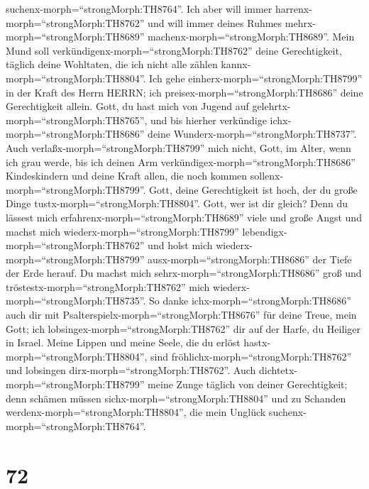 suchenx-morph=``strongMorph:TH8764''.  Ich aber will immer
harrenx-morph=``strongMorph:TH8762'' und will immer deines Ruhmes
mehrx-morph=``strongMorph:TH8689'' machenx-morph=``strongMorph:TH8689''.
 Mein Mund soll verkündigenx-morph=``strongMorph:TH8762''
deine Gerechtigkeit, täglich deine Wohltaten, die ich nicht alle zählen
kannx-morph=``strongMorph:TH8804''.  Ich gehe
einherx-morph=``strongMorph:TH8799'' in der Kraft des Herrn HERRN; ich
preisex-morph=``strongMorph:TH8686'' deine Gerechtigkeit allein.
 Gott, du hast mich von Jugend auf
gelehrtx-morph=``strongMorph:TH8765'', und bis hierher verkündige
ichx-morph=``strongMorph:TH8686'' deine
Wunderx-morph=``strongMorph:TH8737''.  Auch
verlaßx-morph=``strongMorph:TH8799'' mich nicht, Gott, im Alter, wenn
ich grau werde, bis ich deinen Arm
verkündigex-morph=``strongMorph:TH8686'' Kindeskindern und deine Kraft
allen, die noch kommen sollenx-morph=``strongMorph:TH8799''.
 Gott, deine Gerechtigkeit ist hoch, der du große Dinge
tustx-morph=``strongMorph:TH8804''. Gott, wer ist dir gleich?
 Denn du lässest mich
erfahrenx-morph=``strongMorph:TH8689'' viele und große Angst und machst
mich wiederx-morph=``strongMorph:TH8799''
lebendigx-morph=``strongMorph:TH8762'' und holst mich
wiederx-morph=``strongMorph:TH8799'' ausx-morph=``strongMorph:TH8686''
der Tiefe der Erde herauf.  Du machst mich
sehrx-morph=``strongMorph:TH8686'' groß und
tröstestx-morph=``strongMorph:TH8762'' mich
wiederx-morph=``strongMorph:TH8735''.  So danke
ichx-morph=``strongMorph:TH8686'' auch dir mit
Psalterspielx-morph=``strongMorph:TH8676'' für deine Treue, mein Gott;
ich lobsingex-morph=``strongMorph:TH8762'' dir auf der Harfe, du
Heiliger in Israel.  Meine Lippen und meine Seele, die du
erlöst hastx-morph=``strongMorph:TH8804'', sind
fröhlichx-morph=``strongMorph:TH8762'' und lobsingen
dirx-morph=``strongMorph:TH8762''.  Auch
dichtetx-morph=``strongMorph:TH8799'' meine Zunge täglich von deiner
Gerechtigkeit; denn schämen müssen sichx-morph=``strongMorph:TH8804''
und zu Schanden werdenx-morph=``strongMorph:TH8804'', die mein Unglück
suchenx-morph=``strongMorph:TH8764''.

\hypertarget{section-71}{%
\section{72}\label{section-71}}

